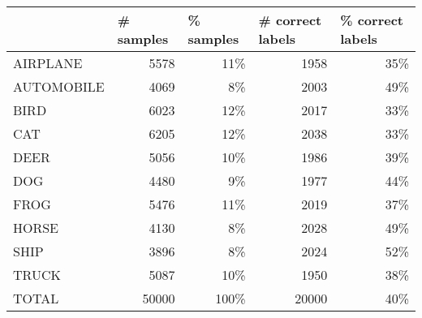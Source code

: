 \documentclass{article}
\begin{document}
\begin{table*}[h]
\begin{tabular}{lrrrr}
\toprule
          & \multicolumn{1}{l}{\# samples} & \multicolumn{1}{l}{\% samples} & \multicolumn{1}{l}{\# correct labels} & \multicolumn{1}{l}{\% correct labels} \\ \hline
\small{AIRPLANE}   & 5578                           & 11\%                           & 1958                                  & 35\%                                  \\
\small{AUTOMOBILE} & 4069                           & 8\%                            & 2003                                  & 49\%                                  \\
\small{BIRD}       & 6023                           & 12\%                           & 2017                                  & 33\%                                  \\
\small{CAT}        & 6205                           & 12\%                           & 2038                                  & 33\%                                  \\
\small{DEER}       & 5056                           & 10\%                           & 1986                                  & 39\%                                  \\
\small{DOG}        & 4480                           & 9\%                            & 1977                                  & 44\%                                  \\
\small{FROG}       & 5476                           & 11\%                           & 2019                                  & 37\%                                  \\
\small{HORSE}      & 4130                           & 8\%                            & 2028                                  & 49\%                                  \\
\small{SHIP}       & 3896                           & 8\%                            & 2024                                  & 52\%                                  \\
\small{TRUCK}      & 5087                           & 10\%                           & 1950                                  & 38\%                                  \\ \hline
TOTAL      & 50000                          & 100\%                          & 20000                                 & 40\%                                  \\ 
\bottomrule
\end{tabular}
\label{tab:c_asym_sample_60}
\end{table*}
\end{document}
